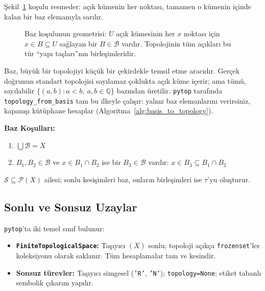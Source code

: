 Şekil~\ref{fig:ch04:baz} koşulu resmeder: açık kümenin her noktası,
tamamen o kümenin içinde kalan bir baz elemanıyla sarılır.

\begin{figure}[ht]
  \centering
  
  \caption{Baz koşulunun geometrisi: $U$ açık kümesinin her $x$ noktası
    için $x\in B\subseteq U$ sağlayan bir $B\in\mathcal{B}$ vardır.
    Topolojinin tüm açıkları bu tür ``yapı taşları''nın birleşimleridir.}
  \label{fig:ch04:baz}
\end{figure}

\begin{nedenonemli}
Baz, büyük bir topolojiyi küçük bir çekirdekle temsil etme aracıdır.
Gerçek doğrunun standart topolojisi sayılamaz çoklukta açık küme içerir;
ama tümü, sayılabilir $\{(a,b): a<b,\ a,b\in\mathbb{Q}\}$ bazından
üretilir. \texttt{pytop} tarafında \texttt{topology\_from\_basis} tam bu
ilkeyle çalışır: yalnız baz elemanlarını verirsiniz, kapanışı kütüphane
hesaplar (Algoritma~\ref{alg:basis_to_topology}).
\end{nedenonemli}

\noindent\textbf{Baz Koşulları:}
\begin{enumerate}
  \item[(B1)] $\bigcup \mathcal{B} = X$
  \item[(B2)] $B_1, B_2 \in \mathcal{B}$ ve $x \in B_1 \cap B_2$ ise bir $B_3 \in \mathcal{B}$
              vardır: $x \in B_3 \subseteq B_1 \cap B_2$
\end{enumerate}

\begin{definition}
$\mathcal{S} \subseteq \mathcal{P}(X)$ ailesi; sonlu kesişimleri baz, onların birleşimleri
ise $\tau$'yu oluşturur.
\end{definition}

\subsection{Sonlu ve Sonsuz Uzaylar}

\texttt{pytop}'ta iki temel sınıf bulunur:
\begin{itemize}
  \item \textbf{\texttt{FiniteTopologicalSpace}:} Taşıyıcı $(X)$ sonlu; topoloji açıkça
        \texttt{frozenset}'ler koleksiyonu olarak saklanır. Tüm hesaplamalar tam ve kesindir.
  \item \textbf{Sonsuz türevler:} Taşıyıcı simgesel (\texttt{'R'}, \texttt{'N'});
        \texttt{topology=None}; etiket tabanlı sembolik çıkarım yapılır.
\end{itemize}

